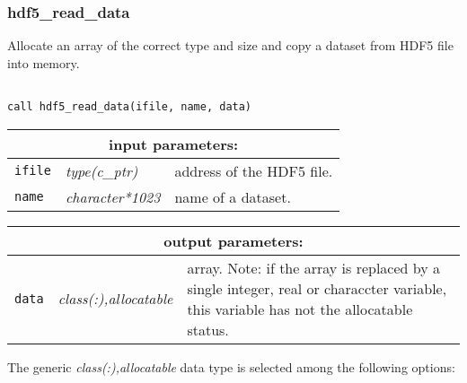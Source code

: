 \vskip 0.8cm

\subsubsection{hdf5\_read\_data}

Allocate an array of the correct type and size and copy a dataset from HDF5 file into memory.

\begin{verbatim}

call hdf5_read_data(ifile, name, data)
\end{verbatim}

\noindent
\begin{tabular}{|p{1.5cm}|p{3cm}|p{10cm}|}
\hline
\multicolumn{3}{|c|}{\bf input parameters:} \\
\hline
{\tt ifile} & {\it type(c\_ptr)} & address of the HDF5 file. \\
\hline
{\tt name} & {\it character*1023} & name of a dataset. \\
\hline
\end{tabular}

\vskip 0.8cm

\noindent
\begin{tabular}{|p{1.5cm}|p{3.5cm}|p{9.5cm}|}
\hline
\multicolumn{3}{|c|}{\bf output parameters:} \\
\hline
{\tt data} & {\it class(:),allocatable} & array. Note: if the array is replaced by a single integer, real or characcter variable,
this variable has not the allocatable status.\\
\hline
\end{tabular}

\vskip 0.5cm

\noindent The generic {\it class(:),allocatable} data type is selected among the following options:

